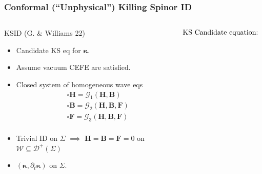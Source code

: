 \documentclass[10pt]{beamer}
\theoremstyle{plain}
\def\bmB{{\bm B}}
\def\bmF{{\bm F}}
\def\bmH{{\bm H}}
\begin{document}
\begin{frame}
\frametitle{  Conformal  (``Unphysical'') Killing Spinor ID}
\begin{columns}
\column{6.0cm}
\vspace{-4mm}
\vspace{-10mm}
\pause
\begin{exampleblock}{KSID (G. \& Williams 22) }
  \begin{itemize}
  \item Candidate KS eq for $\bm\kappa$.
  \item Assume vacuum CEFE are satisfied.
  \item Closed system of homogeneous wave eqs
    \begin{eqnarray*}
    && \square \bmH = \mathcal{G}_{1}(\bmH,\bmB)\\
    && \square \bmB = \mathcal{G}_{2}(\bmH,\bmB, \bmF)\\
   && \square \bmF = \mathcal{G}_{3}(\bmH,\bmB,\bmF)\\
    \end{eqnarray*}
    \vspace{-12mm}
  \item
    Trivial ID on $\Sigma$ %
    $\implies$
    $\bmH=\bmB=\bmF=0$ on $\mathcal{W}\subseteq \mathcal{D}^{+}({\Sigma})$
    \item $(\bm\kappa,\partial_t \bm\kappa)$ on $\Sigma$.
  \end{itemize}
\end{exampleblock}
\column{5.8cm}
\vspace{-3mm}
\begin{block}{}
  \vspace{-5mm}
  \pause
\begin{equation*}
  \begin{array}{ll}
    \textcolor{black}{ \text{KS Candidate equation:}}

\end{array}
\end{equation*}
\end{block}
\end{columns}
\end{frame}
\end{document}
